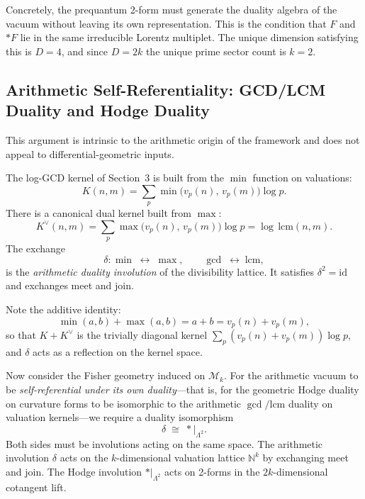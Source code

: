 \documentclass[11pt]{article}
\begin{document}
Concretely, the prequantum 2-form must generate the duality algebra of the vacuum
without leaving its own representation. This is the condition that $F$ and $*F$
lie in the same irreducible Lorentz multiplet. The unique dimension satisfying this
is $D=4$, and since $D=2k$ the unique prime sector count is $k=2$.

\subsection{Arithmetic Self-Referentiality: GCD/LCM Duality and Hodge Duality}

This argument is intrinsic to the arithmetic origin of the framework and does not
appeal to differential-geometric inputs.

The log-GCD kernel of Section~3 is built from the $\min$ function on valuations:
\begin{equation}
K(n,m) = \sum_p \min\!\bigl(v_p(n),\,v_p(m)\bigr)\log p.
\end{equation}
There is a canonical dual kernel built from $\max$:
\begin{equation}
K^\vee(n,m) = \sum_p \max\!\bigl(v_p(n),\,v_p(m)\bigr)\log p
= \log\,\mathrm{lcm}(n,m).
\end{equation}
The exchange
\begin{equation}
\delta\colon \min \;\longleftrightarrow\; \max,
\qquad
\gcd \;\longleftrightarrow\; \mathrm{lcm},
\end{equation}
is the \emph{arithmetic duality involution} of the divisibility lattice.
It satisfies $\delta^2 = \mathrm{id}$ and exchanges meet and join.

Note the additive identity:
\begin{equation}
\min(a,b) + \max(a,b) = a + b = v_p(n) + v_p(m),
\end{equation}
so that $K + K^\vee$ is the trivially diagonal kernel $\sum_p (v_p(n)+v_p(m))\log p$,
and $\delta$ acts as a reflection on the kernel space.

Now consider the Fisher geometry induced on $\mathcal{M}_k$.
For the arithmetic vacuum to be \emph{self-referential under its own duality}---that is,
for the geometric Hodge duality on curvature forms to be isomorphic to the arithmetic
$\gcd/\mathrm{lcm}$ duality on valuation kernels---we require a duality isomorphism
\begin{equation}
\delta \;\cong\; {*}\big|_{\Lambda^2}.
\end{equation}
Both sides must be involutions acting on the same space.
The arithmetic involution $\delta$ acts on the $k$-dimensional valuation lattice
$\mathbb{N}^k$ by exchanging meet and join.
The Hodge involution $*|_{\Lambda^2}$ acts on 2-forms in the $2k$-dimensional
cotangent lift.
\end{document}
